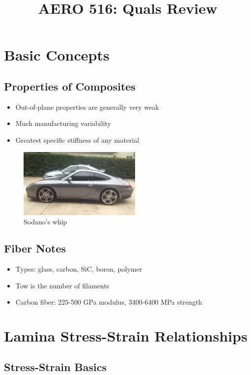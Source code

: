 \documentclass[11pt]{article}
\title{\vspace{-2cm}AERO 516: Quals Review\vspace{-1.0cm}}
\begin{document}
    \maketitle

    \section{Basic Concepts}
    \subsection{Properties of Composites}
    \begin{itemize}
        \item{Out-of-plane properties are generally very weak}
        \item{Much manufacturing variability}
        \item{Greatest specific stiffness of any material}
    \end{itemize}

    \begin{figure}[H]
        \includegraphics[width=6cm]{porsche}\centering
        \caption{Sodano's whip}
        \label{fig:1}
    \end{figure}

    \subsection{Fiber Notes}
    \begin{itemize}
        \item{Types: glass, carbon, SiC, boron, polymer}
        \item{Tow is the number of filaments}
        \item{Carbon fiber: 225-500 GPa modulus, 3400-6400 MPa strength}
    \end{itemize}

    \section{Lamina Stress-Strain Relationships}
    \subsection{Stress-Strain Basics}
\end{document}
